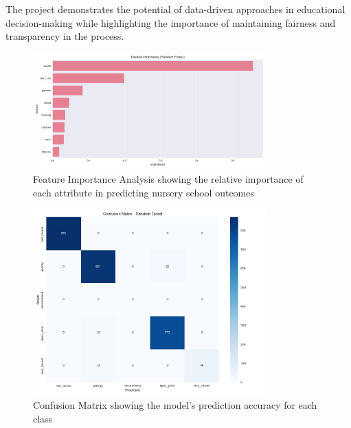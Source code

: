 The project demonstrates the potential of data-driven approaches in educational decision-making while highlighting the importance of maintaining fairness and transparency in the process.

\begin{figure}[h]
    \centering
    \includegraphics[width=0.8\textwidth]{results/feature_importance.png}
    \caption{Feature Importance Analysis showing the relative importance of each attribute in predicting nursery school outcomes}
    \label{fig:feature_importance}
\end{figure}

\begin{figure}[h]
    \centering
    \includegraphics[width=0.8\textwidth]{results/confusion_matrix.png}
    \caption{Confusion Matrix showing the model's prediction accuracy for each class}
    \label{fig:confusion_matrix}
\end{figure}

